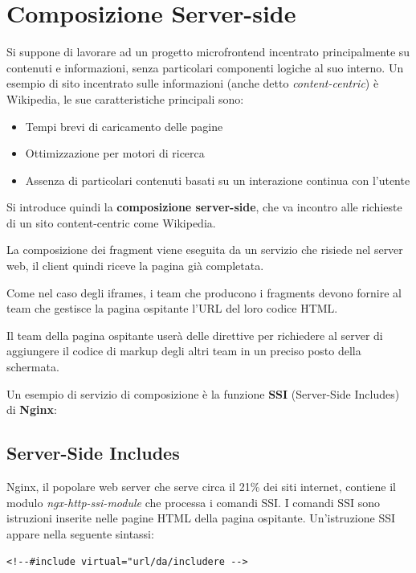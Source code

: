 \section{Composizione Server-side}
Si suppone di lavorare ad un progetto microfrontend incentrato principalmente su contenuti e informazioni, senza particolari componenti logiche al suo interno.
Un esempio di sito incentrato sulle informazioni (anche detto \emph{content-centric}) è Wikipedia, le sue caratteristiche principali sono:
\begin{itemize}
    \item Tempi brevi di caricamento delle pagine
    \item Ottimizzazione per motori di ricerca
    \item Assenza di particolari contenuti basati su un interazione continua con l'utente
\end{itemize}

Si introduce quindi la \textbf{composizione server-side}, che va incontro alle richieste di un sito content-centric come Wikipedia.

La composizione dei fragment viene eseguita da un servizio che risiede nel server web, il client quindi riceve la pagina già completata.

Come nel caso degli iframes, i team che producono i fragments devono 
fornire al team che gestisce la pagina ospitante l'URL del loro codice HTML.

Il team della pagina ospitante userà delle direttive 
per richiedere al server di aggiungere il codice di markup degli altri team in un preciso posto della schermata.

Un esempio di servizio di composizione è la funzione \textbf{SSI} (Server-Side Includes) di \textbf{Nginx}:

\subsection{Server-Side Includes}

Nginx, il popolare web server che serve circa il 21\% dei siti internet\cite{nginx}, contiene il modulo \emph{ngx-http-ssi-module} che processa i comandi SSI.
 I comandi SSI sono istruzioni
inserite nelle pagine HTML della pagina ospitante. Un'istruzione SSI appare nella seguente sintassi:

   \begin{center}
    \verb|<!--#include virtual="url/da/includere -->|
   \end{center}

